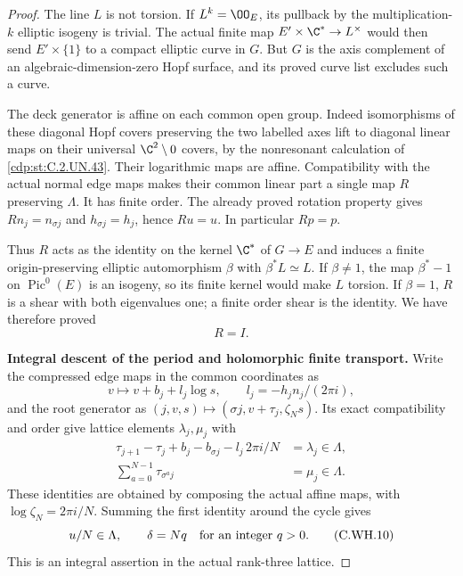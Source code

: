 \begin{proof}
The line $L$ is not torsion. If
$L^k=\OO_E$, its pullback by the
multiplication-$k$ elliptic isogeny
is trivial. The actual finite map
$E'\times\C^*\to L^\times$ would
then send $E'\times\{1\}$ to a
compact elliptic curve in $G$.
But $G$ is the axis complement of
an algebraic-dimension-zero Hopf
surface, and its proved curve list
excludes such a curve.

The deck generator is affine on
each common open group. Indeed
isomorphisms of these diagonal
Hopf covers preserving the two
labelled axes lift to diagonal
linear maps on their universal
$\C^2\setminus0$ covers, by the
nonresonant calculation of \ref{cdp:st:C.2.UN.43}.
Their logarithmic maps are affine.
Compatibility with the actual
normal edge maps makes their
common linear part a single map
$R$ preserving $\Lambda$. It has
finite order. The already proved
rotation property gives
$R n_j=n_{\sigma j}$ and
$h_{\sigma j}=h_j$, hence $Ru=u$.
In particular $Rp=p$.

Thus $R$ acts as the identity on
the kernel $\C^*$ of $G\to E$
and induces a finite origin-preserving
elliptic automorphism $\beta$ with
$\beta^*L\simeq L$. If $\beta\ne1$,
the map $\beta^*-1$ on
$\operatorname{Pic}^0(E)$ is an
isogeny, so its finite kernel
would make $L$ torsion. If
$\beta=1$, $R$ is a shear with
both eigenvalues one; a finite
order shear is the identity.
We have therefore proved
\[
                              R=I.
\tag{C.WH.8}\label{cdp:eq:C.WH.8}
\]

\par\medskip\noindent\textbf{Integral descent of the period and holomorphic finite transport.}
Write the compressed edge maps in
the common coordinates as
\[
 v\longmapsto v+b_j+l_j\log s,
 \qquad l_j=-h_jn_j/(2\pi i),
\]
and the root generator as
$(j,v,s)\mapsto(\sigma j,v+\tau_j,\zeta_Ns)$.
Its exact compatibility and order give
lattice elements $\lambda_j,\mu_j$ with
\[
 \begin{aligned}
 \tau_{j+1}-\tau_j+b_j-b_{\sigma j}
                   -l_j\,2\pi i/N&=\lambda_j\in\Lambda,\\
 \sum_{a=0}^{N-1}\tau_{\sigma^a j}&=\mu_j\in\Lambda.
 \end{aligned}
\tag{C.WH.9}\label{cdp:eq:C.WH.9}
\]
These identities are obtained by composing
the actual affine maps, with
$\log\zeta_N=2\pi i/N$.
Summing the first identity around the
cycle gives
\[
                   u/N\in\Lambda,\qquad
                 \delta=Nq\quad\hbox{for an integer }q>0.
\tag{C.WH.10}\label{cdp:eq:C.WH.10}
\]
This is an integral assertion in the
actual rank-three lattice.


\end{proof}
